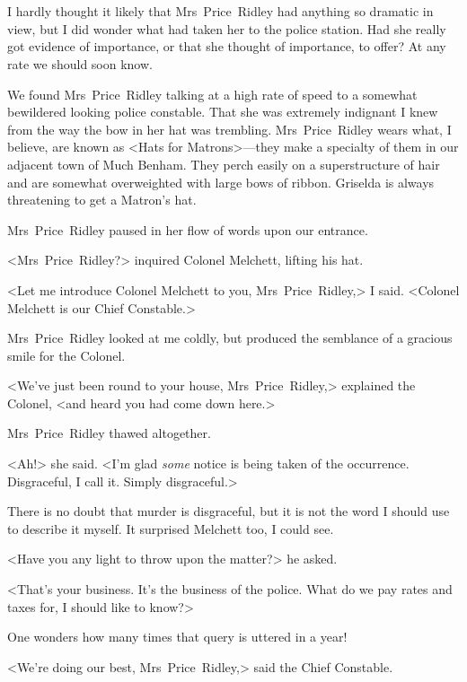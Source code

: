 \chapter[Chapter  \thechapter]{}


\lettrine{I}{} hardly thought it likely that Mrs~Price~Ridley had anything so dramatic in view, but I did wonder what had taken her to the police station. Had she really got evidence of importance, or that she thought of importance, to offer? At any rate we should soon know.

We found Mrs~Price~Ridley talking at a high rate of speed to a somewhat bewildered looking police constable. That she was extremely indignant I knew from the way the bow in her hat was trembling. Mrs~Price~Ridley wears what, I believe, are known as <Hats for Matrons>—they make a specialty of them in our adjacent town of Much Benham. They perch easily on a superstructure of hair and are somewhat overweighted with large bows of ribbon. Griselda is always threatening to get a Matron's hat.

Mrs~Price~Ridley paused in her flow of words upon our entrance.

<Mrs~Price~Ridley?> inquired Colonel Melchett, lifting his hat.

<Let me introduce Colonel Melchett to you, Mrs~Price~Ridley,> I said. <Colonel Melchett is our Chief Constable.>

Mrs~Price~Ridley looked at me coldly, but produced the semblance of a gracious smile for the Colonel.

<We've just been round to your house, Mrs~Price~Ridley,> explained the Colonel, <and heard you had come down here.>

Mrs~Price~Ridley thawed altogether.

<Ah!> she said. <I'm glad \textit{some} notice is being taken of the occurrence. Disgraceful, I call it. Simply disgraceful.>

There is no doubt that murder is disgraceful, but it is not the word I should use to describe it myself. It surprised Melchett too, I could see.

<Have you any light to throw upon the matter?> he asked.

<That's your business. It's the business of the police. What do we pay rates and taxes for, I should like to know?>

One wonders how many times that query is uttered in a year!

<We're doing our best, Mrs~Price~Ridley,> said the Chief Constable.

